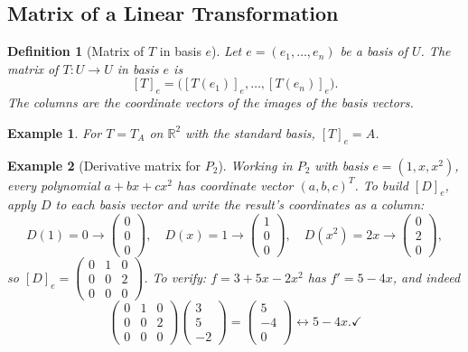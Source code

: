 \documentclass{article}
\newtheorem{definition}{Definition}
\newtheorem*{example}{Example}
\begin{document}
\subsection{Matrix of a Linear Transformation}

\begin{definition}[Matrix of $T$ in basis $e$]
    Let $e=(e_1,\ldots,e_n)$ be a basis of $U$. The matrix of $T: U\to U$ in basis $e$ is
    \[[T]_e = \bigl([T(e_1)]_e,\ldots,[T(e_n)]_e\bigr).\]
    The columns are the coordinate vectors of the images of the basis vectors.
\end{definition}
\begin{example}
    For $T=T_A$ on $\mathbb{R}^2$ with the standard basis, $[T]_e = A$.
\end{example}
\begin{example}[Derivative matrix for $P_2$]
    Working in $P_2$ with basis $e=(1,x,x^2)$, every polynomial $a+bx+cx^2$ has coordinate vector $(a,b,c)^T$. To build $[D]_e$, apply $D$ to each basis vector and write the result's coordinates as a column:
    \[D(1)=0\to\begin{pmatrix}0\\0\\0\end{pmatrix},\quad D(x)=1\to\begin{pmatrix}1\\0\\0\end{pmatrix},\quad D(x^2)=2x\to\begin{pmatrix}0\\2\\0\end{pmatrix},\]
    so $[D]_e=\begin{pmatrix}0&1&0\\0&0&2\\0&0&0\end{pmatrix}$. To verify: $f=3+5x-2x^2$ has $f'=5-4x$, and indeed
    \[\begin{pmatrix}0&1&0\\0&0&2\\0&0&0\end{pmatrix}\begin{pmatrix}3\\5\\-2\end{pmatrix}=\begin{pmatrix}5\\-4\\0\end{pmatrix}\longleftrightarrow 5-4x.\checkmark\]
\end{example}
\end{document}

